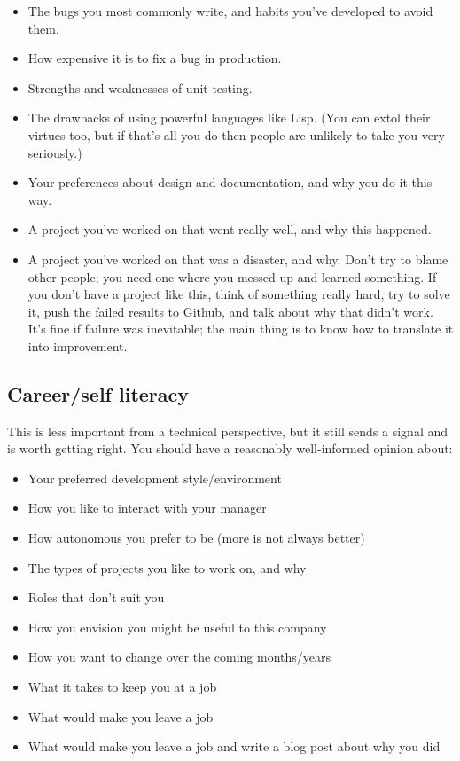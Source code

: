 \documentclass{article}
\begin{document}
\begin{itemize}
\item{The bugs you most commonly write, and habits you've developed to}
  avoid them.
\item{How expensive it is to fix a bug in production.}
\item{Strengths and weaknesses of unit testing.}
\item{The drawbacks of using powerful languages like Lisp. (You can}
  extol their virtues too, but if that's all you do then people are
  unlikely to take you very seriously.)
\item{Your preferences about design and documentation, and why you do it}
  this way.
\item{A project you've worked on that went really well, and why this}
  happened.
\item{A project you've worked on that was a disaster, and why. Don't try}
  to blame other people; you need one where you messed up and learned
  something. If you don't have a project like this, think of something
  really hard, try to solve it, push the failed results to Github, and
  talk about why that didn't work. It's fine if failure was inevitable;
  the main thing is to know how to translate it into improvement.
\end{itemize}

\subsection{Career/self literacy}
    This is less important from a technical perspective, but it still sends a
    signal and is worth getting right. You should have a reasonably
    well-informed opinion about:

\begin{itemize}
\item{Your preferred development style/environment}
\item{How you like to interact with your manager}
\item{How autonomous you prefer to be (more is not always better)}
\item{The types of projects you like to work on, and why}
\item{Roles that don't suit you}
\item{How you envision you might be useful to this company}
\item{How you want to change over the coming months/years}
\item{What it takes to keep you at a job}
\item{What would make you leave a job}
\item{What would make you leave a job and write a blog post about why}
  you did
\end{itemize}
\end{document}
